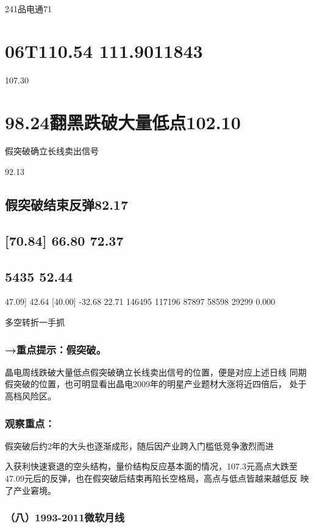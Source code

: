 \documentclass{article}
\begin{document}
241品电通71

\section{06T110.54 111.9011843}

107.30

\section{98.24翻黑跌破大量低点102.10}

假突破确立长线卖出信号

92.13

\subsection{假突破结束反弹82.17}

\subsection{[70.84] 66.80 72.37}

\subsection{5435 52.44}

47.09] 42.64 [40.00] -32.68 22.71 146495 117196 87897 58598 29299 0.000

\clearpage

多空转折一手抓

\subsubsection{→重点提示：假突破。}

晶电周线跌破大量低点假突破确立长线卖出信号的位置，便是对应上述日线 同期假突破的位置，也可明显看出晶电2009年的明星产业题材大涨将近四倍后， 处于高档风险区。

\subsubsection{观察重点：}

假突破后约2年的大头也逐渐成形，随后因产业跨入门槛低竞争激烈而进

入获利快速衰退的空头结构，量价结构反应基本面的情况，107.3元高点大跌至 47.09元后的反弹，也在假突破后结束再陷长空格局，高点与低点皆越来越低反 映了产业窘境。

\subsubsection{（八）1993-2011微软月线}
\end{document}
